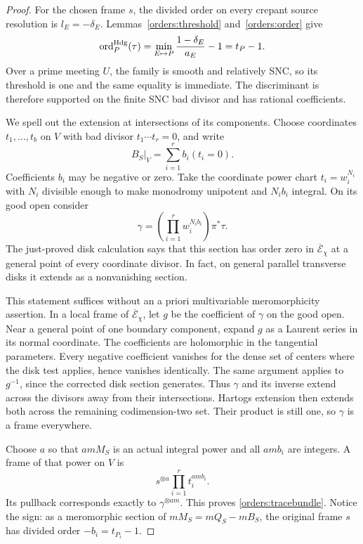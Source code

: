 \begin{proof}
For the chosen frame \(s\), the divided order on every crepant
source resolution is \(l_E=-\delta_E\).  Lemmas~\ref{orders:threshold}
and~\ref{orders:order} give
\[
 \operatorname{ord}_P^{\mathrm{Hdg}}(\tau)
   =\min_{E\mapsto P}\frac{1-\delta_E}{a_E}-1=t_P-1.
\]
Over a prime meeting \(U\), the family is smooth and relatively
SNC, so its threshold is one and the same equality is immediate.
The discriminant is therefore supported on the finite SNC bad
divisor and has rational coefficients.

We spell out the extension at intersections of its components.
Choose coordinates \(t_1,\ldots,t_b\) on \(V\) with bad divisor
\(t_1\cdots t_r=0\), and write
\[
                       B_S|_V=\sum_{i=1}^r b_i(t_i=0).
\]
Coefficients \(b_i\) may be negative or zero.  Take the coordinate
power chart \(t_i=w_i^{N_i}\) with \(N_i\) divisible enough to
make monodromy unipotent and \(N_i b_i\) integral.  On its good
open consider
\begin{equation}
                 \gamma=
                 \left(\prod_{i=1}^r w_i^{N_i b_i}\right)\pi^*\tau.
 \label{orders:correctedroot}
\end{equation}
The just-proved disk calculation says that this section has order
zero in \(\overline{\mathcal E}_\chi\) at a general point of every
coordinate divisor.  In fact, on general parallel transverse
disks it extends as a nonvanishing section.

This statement suffices without an a priori multivariable
meromorphicity assertion.  In a local frame of
\(\overline{\mathcal E}_\chi\), let \(g\) be the coefficient of
\(\gamma\) on the good open.  Near a general point of one boundary
component, expand \(g\) as a Laurent series in its normal
coordinate.  The coefficients are holomorphic in the tangential
parameters.  Every negative coefficient vanishes for the dense
set of centers where the disk test applies, hence vanishes
identically.  The same argument applies to \(g^{-1}\), since
the corrected disk section generates.  Thus \(\gamma\) and its
inverse extend across the divisors away from their intersections.
Hartogs extension then extends both across the remaining
codimension-two set.  Their product is still one, so
\(\gamma\) is a frame everywhere.

Choose \(a\) so that \(amM_S\) is an actual integral power and
all \(am b_i\) are integers.  A frame of that power on \(V\) is
\[
                 s^{\otimes a}\prod_{i=1}^r t_i^{am b_i}.
\]
Its pullback corresponds exactly to \(\gamma^{\otimes am}\).
This proves \eqref{orders:tracebundle}.  Notice the sign:
as a meromorphic section of \(mM_S=mQ_S-mB_S\), the original
frame \(s\) has divided order \(-b_i=t_{P_i}-1\).


\end{proof}
